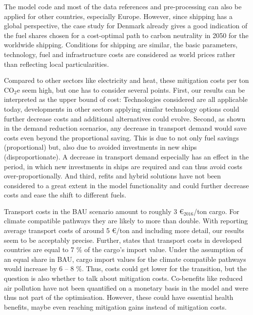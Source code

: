 \documentclass[article]{elsarticle}
\begin{document}
The model code and most of the data references and pre-processing can also be applied for other countries, especially Europe. However, since shipping has a global perspective, the case study for Denmark already gives a good indication of the fuel shares chosen for a cost-optimal path to carbon neutrality in 2050 for the worldwide shipping. Conditions for shipping are similar, the basic parameters, technology, fuel and infrastructure costs are considered as world prices rather than reflecting local particularities. %

Compared to other sectors like electricity and heat, these mitigation costs per ton CO$_2$e seem high, but one has to consider several points. First, our results can be interpreted as the upper bound of cost: Technologies considered are all applicable today, developments in other sectors applying similar technology options could further decrease costs and additional alternatives could evolve. Second, as shown in the demand reduction scenarios, any decrease in transport demand would save costs even beyond the proportional saving. This is due to not only fuel savings (proportional) but, also due to avoided investments in new ships (disproportionate). A decrease in transport demand especially has an effect in the period, in which new investments in ships are required and can thus avoid costs over-proportionally. And third, refits and hybrid solutions have not been considered to a great extent in the model functionality and could further decrease costs and ease the shift to different fuels.

Transport costs in the BAU scenario amount to roughly 3 \euro$_{2016}$/ton cargo. For climate compatible pathways they are likely to more than double. With \citet[p.~50]{UNCTAD2015} reporting average transport costs of around 5 \euro/ton and including more detail, our results seem to be acceptably precise. Further, \cite[p.~55]{UNCTAD2015} states that transport costs in developed countries are equal to 7 \% of the cargo's import value. Under the assumption of an equal share in BAU, cargo import values for the climate compatible pathways would increase by 6 -- 8 \%.
%
%
Thus, costs could get lower for the transition, but the question is also whether to talk about mitigation costs. Co-benefits like reduced air pollution have not been quantified on a monetary basis in the model and were thus not part of the optimisation. However, these could have essential health benefits, maybe even reaching mitigation gains instead of mitigation costs.
\end{document}
